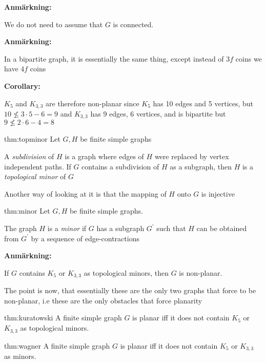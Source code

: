 \par\bigskip
\noindent\textbf{Anmärkning:}\par
\noindent We do not need to assume that $G$ is connected.
\par\bigskip
\noindent\textbf{Anmärkning:}\par
\noindent In a bipartite graph, it is essentially the same thing, except instead of $3f$ coins we have $4f$ coins
\par\bigskip
\noindent\textbf{Corollary:}\par
\noindent $K_5$ and $K_{3,3}$ are therefore non-planar since $K_5$ has 10 edges and 5 vertices, but $10\not\leq 3\cdot5 -6 = 9$ and $K_{3,3}$ has 9 edges, 6 vertices, and is bipartite but $9\not\leq 2\cdot6-4 = 8$
\newpage
\begin{theo}{thm:topminor}
  Let $G,H$ be finite simple graphs
  \par\bigskip
  \noindent A \textit{subdivision} of $H$ is a graph where edges of $H$ were replaced by vertex independent paths. If $G$ contains a subdivision of $H$ as a subgraph, then $H$ is a \textit{topological minor} of $G$
  \par\bigskip
  \noindent Another way of looking at it is that the mapping of $H$ onto $G$ is injective
\end{theo}
\par\bigskip
\begin{theo}[Minor]{thm:minor}
  Let $G,H$ be finite simple graphs.
  \par\bigskip
  \noindent The graph $H$ is a \textit{minor} if $G$ has a subgraph $G^{\prime}$ such that $H$ can be obtained from $G^{\prime}$ by a sequence of edge-contractions
\end{theo}
\par\bigskip
\noindent\textbf{Anmärkning:}\par
\noindent If $G$ contains $K_5$ or $K_{3,3}$ as topological minors, then $G$ is non-planar.
\par\bigskip
\noindent The point is now, that essentially these are the only two graphs that force to be non-planar, i.e these are the only obstacles that force planarity
\par\bigskip
\begin{theo}[Kuratowski]{thm:kuratowski}
  A finite simple graph $G$ is planar iff it does not contain $K_5$ or $K_{3,3}$ as topological minors.
\end{theo}
\par\bigskip
\begin{theo}[Wagner]{thm:wagner}
  A finite simple graph $G$ is planar iff it does not contain $K_5$ or $K_{3,3}$ as minors.
\end{theo}

